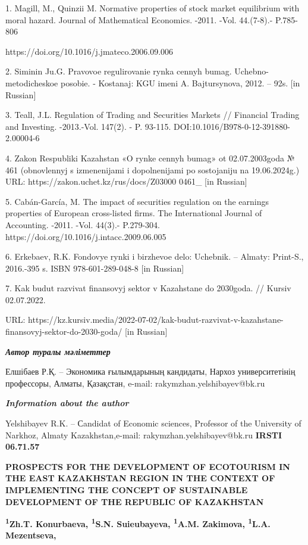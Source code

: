 1. Magill, M., Quinzii M. Normative properties of stock market
equilibrium with moral hazard. Journal of Mathematical Economics. -2011.
-Vol. 44.(7-8).- P.785-806

https://doi.org/10.1016/j.jmateco.2006.09.006

2. Siminin Ju.G. Pravovoe regulirovanie rynka cennyh bumag.
Uchebno-metodicheskoe posobie. - Kostanaj: KGU imeni A. Bajtursynova,
2012. -- 92s. {[}in Russian{]}

3. Teall, J.L. Regulation of Trading and Securities Markets // Financial
Trading and Investing. -2013.-Vol. 147(2). - P. 93-115.
DOI:10.1016/B978-0-12-391880-2.00004-6

4. Zakon Respubliki Kazahstan «O rynke cennyh bumag» ot 02.07.2003goda №
461 (obnovlennyj s izmenenijami i dopolnenijami po sostojaniju na
19.06.2024g.) URL: https://zakon.uchet.kz/rus/docs/Z03000 0461\_ {[}in
Russian{]}

5. Cabán-García, M. The impact of securities regulation on the earnings
properties of European cross-listed firms. The International Journal of
Accounting. -2011. -Vol. 44(3).- P.279-304.
https://doi.org/10.1016/j.intacc.2009.06.005

6. Erkebaev, R.K. Fondovye rynki i birzhevoe delo: Uchebnik. -- Almaty:
Print-S., 2016.-395 s. ISBN 978-601-289-048-8 {[}in Russian{]}

7. Kak budut razvivat\textquotesingle{} finansovyj sektor v Kazahstane
do 2030goda. // Kursiv 02.07.2022.

URL:
https://kz.kursiv.media/2022-07-02/kak-budut-razvivat-v-kazahstane-finansovyj-sektor-do-2030-goda/
{[}in Russian{]}

\emph{{\bfseries Автор туралы мәліметтер}}

Елшібаев Р.Қ. -- Экономика ғылымдарының кандидаты, Нархоз
университетінің профессоры, Алматы, Қазақстан, e-mail:
rakymzhan.yelshibayev@bk.ru

\emph{{\bfseries Information about the author}}

Yelshibayev R.K. -- Сandidat of Economic sciences, Professor of the
University of Narkhoz, Almaty Kazakhstan,e-mail:
rakymzhan.yelshibayev@bk.ru\newpage
{\bfseries IRSTI 06.71.57}

{\bfseries PROSPECTS FOR THE DEVELOPMENT OF ECOTOURISM IN THE EAST
KAZAKHSTAN REGION IN THE CONTEXT OF IMPLEMENTING THE CONCEPT OF
SUSTAINABLE DEVELOPMENT OF THE REPUBLIC OF KAZAKHSTAN}

{\bfseries \textsuperscript{1}Zh.T. Konurbaeva, \textsuperscript{1}S.N.
Suieubayeva, \textsuperscript{1}A.M. Zakimova, \textsuperscript{1}L.A.
Mezentseva,}

